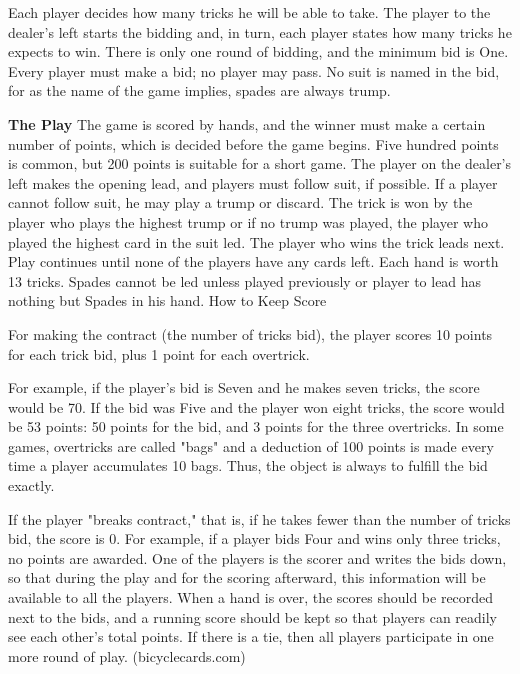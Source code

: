 \documentclass[journal, a4paper]{IEEEtran}
\begin{document}
Each player decides how many tricks he will be able to take. The player to the dealer's left starts the bidding and, in turn, each player states how many tricks he expects to win. There is only one round of bidding, and the minimum bid is One. Every player must make a bid; no player may pass. No suit is named in the bid, for as the name of the game implies, spades are always trump.\newline

\textbf{The Play}\newline
The game is scored by hands, and the winner must make a certain number of points, which is decided before the game begins. Five hundred points is common, but 200 points is suitable for a short game. The player on the dealer's left makes the opening lead, and players must follow suit, if possible. If a player cannot follow suit, he may play a trump or discard. The trick is won by the player who plays the highest trump or if no trump was played, the player who played the highest card in the suit led. The player who wins the trick leads next. Play continues until none of the players have any cards left. Each hand is worth 13 tricks. Spades cannot be led unless played previously or player to lead has nothing but Spades in his hand.
How to Keep Score

For making the contract (the number of tricks bid), the player scores 10 points for each trick bid, plus 1 point for each overtrick.

For example, if the player's bid is Seven and he makes seven tricks, the score would be 70. If the bid was Five and the player won eight tricks, the score would be 53 points: 50 points for the bid, and 3 points for the three overtricks. In some games, overtricks are called "bags" and a deduction of 100 points is made every time a player accumulates 10 bags. Thus, the object is always to fulfill the bid exactly.

If the player "breaks contract," that is, if he takes fewer than the number of tricks bid, the score is 0. For example, if a player bids Four and wins only three tricks, no points are awarded.
One of the players is the scorer and writes the bids down, so that during the play and for the scoring afterward, this information will be available to all the players. When a hand is over, the scores should be recorded next to the bids, and a running score should be kept so that players can readily see each other's total points. If there is a tie, then all players participate in one more round of play. (bicyclecards.com)
\end{document}
